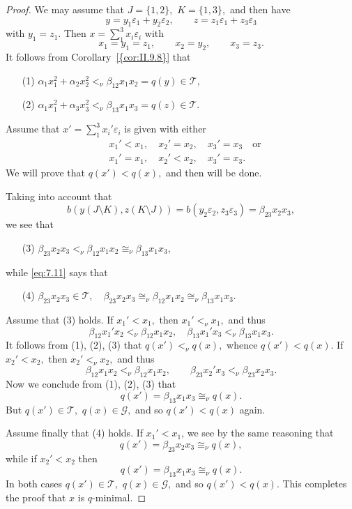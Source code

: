 \documentclass [12pt,a4paper,reqno]{amsart}
\begin{document}
\begin{proof} We may assume that $J=\{1,2\},$ $K=\{1,3\},$
 and then
have
$$y=y_1{\varepsilon}_1+y_2{\varepsilon}_2,\qquad
z=z_1{\varepsilon}_1+z_3{\varepsilon}_3$$ with $y_1=z_1.$ Then
$x=\sum\limits_1^3 x_i{\varepsilon}_i$ with
$$x_1=y_1 = z_1,\qquad x_2=y_2,\qquad x_3=z_3.$$
It follows from {Corollary~\ref{{cor:II.9.8}}}
 that
\begin{enumerate} {\setlength{\itemsep}{2pt}}
\item[(1)]
${\alpha}_1x_1^2+{\alpha}_2x_2^2<_\nu{\beta}_{12}x_1x_2=q(y)\in{\mathcal T},$

\item[(2)] ${\alpha}_1x_1^2+{\alpha}_3x_3^2<_\nu
{\beta}_{13}x_1x_3=q(z)\in{\mathcal T}.$
\end{enumerate}
Assume that $x'=\sum\limits_1^3x_i'{\varepsilon}_i$ is given with
either
\begin{align*}
&x_1'<x_1,\quad x_2'=x_2,\quad x_3'=x_3\quad\text{or}\\
&x_1'=x_1,\quad x_2'<x_2,\quad x_3'=x_3.
\end{align*}
We will prove that $q(x')<q(x),$ and then will be done.

Taking into account that
$$b(y(J\setminus K),z(K\setminus
J))=b(y_2{\varepsilon}_2,z_3{\varepsilon}_3)={\beta}_{23}x_2x_3,$$ we
see that
\begin{enumerate}
\item[(3)] ${\beta}_{23}x_2x_3<_\nu {\beta}_{12}x_1x_2\cong_\nu
{\beta}_{13}x_1x_3,$
\end{enumerate}
while \eqref{eq:7.11} says that
\begin{enumerate}
\item[(4)] ${\beta}_{23}x_2x_3\in{\mathcal T},\quad
{\beta}_{23}x_2x_3\cong_\nu
{\beta}_{12}x_1x_2\cong_\nu{\beta}_{13}x_1x_3.$
\end{enumerate}

Assume that (3) holds. If $x_1'<x_1,$ then $x_1'<_\nu x_1,$ and
thus
$${\beta}_{12}x_1'x_2<_\nu {\beta}_{12}x_1x_2,\quad
{\beta}_{13}x_1'x_3<_\nu{\beta}_{13}x_1x_3.$$ It follows from (1),
(2), (3) that $q(x')<_\nu q(x),$ whence $q(x')<q(x).$ If
$x_2'<x_2,$ then $x_2'<_\nu x_2,$ and thus
$${\beta}_{12}x_1x_2<_\nu {\beta}_{12}x_1x_2,\qquad
{\beta}_{23}x_2'x_3<_\nu{\beta}_{23}x_2x_3.$$ Now we conclude from
(1), (2), (3) that
$$q(x')={\beta}_{13}x_1x_3\cong_\nu q(x).$$
But $q(x')\in{\mathcal T},$ $q(x)\in{\mathcal G},$ and so
$q(x')<q(x)$ again.

Assume finally that (4) holds. If $x_1'<x_1$, we see by the same
reasoning that $$q(x')={\beta}_{23}x_2x_3\cong_\nu q(x),$$ while if
$x_2'<x_2$ then
$$q(x')={\beta}_{13}x_1x_3\cong_\nu q(x).$$
In both cases $q(x')\in{\mathcal T},$ $q(x)\in{\mathcal G},$ and so
$q(x')<q(x).$ This completes the proof that $x$ is $q$-minimal.
\end{proof}
\end{document}

